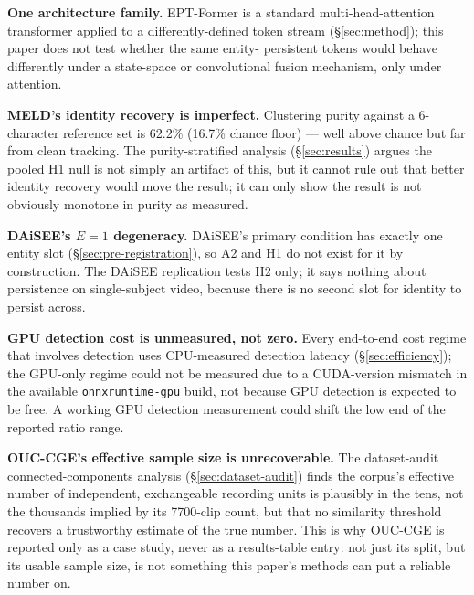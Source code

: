 \textbf{One architecture family.} EPT-Former is a standard multi-head-attention
transformer applied to a differently-defined token stream
(\S\ref{sec:method}); this paper does not test whether the same entity-
persistent tokens would behave differently under a state-space or
convolutional fusion mechanism, only under attention.

\textbf{MELD's identity recovery is imperfect.}
Clustering purity against a 6-character reference set is 62.2\% (16.7\%
chance floor) --- well above chance but far from clean tracking. The
purity-stratified analysis (\S\ref{sec:results}) argues the pooled H1 null
is not simply an artifact of this, but it cannot rule out that better
identity recovery would move the result; it can only show the result is not
obviously monotone in purity as measured.

\textbf{DAiSEE's $E{=}1$ degeneracy.} DAiSEE's primary condition has exactly
one entity slot (\S\ref{sec:pre-registration}), so A2 and H1 do not exist for
it by construction. The DAiSEE replication tests H2 only; it says nothing
about persistence on single-subject video, because there is no second slot
for identity to persist across.

\textbf{GPU detection cost is unmeasured, not zero.} Every end-to-end cost
regime that involves detection uses CPU-measured detection latency
(\S\ref{sec:efficiency}); the GPU-only regime could not be measured due to a
CUDA-version mismatch in the available \texttt{onnxruntime-gpu} build, not
because GPU detection is expected to be free. A working GPU detection
measurement could shift the low end of the reported ratio range.

\textbf{OUC-CGE's effective sample size is unrecoverable.} The dataset-audit
connected-components analysis
(\S\ref{sec:dataset-audit}) finds the corpus's effective number of
independent, exchangeable recording units is plausibly in the tens, not the
thousands implied by its 7700-clip count, but that no similarity threshold
recovers a trustworthy estimate of the true number. This is why OUC-CGE is
reported only as a case study, never as a results-table entry: not just its
split, but its usable sample size, is not something this paper's methods can
put a reliable number on.
